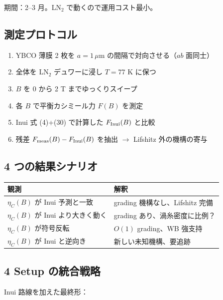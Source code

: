 \documentclass[11pt,a4paper]{article}
\def\textbf#1{#1}%
\begin{document}
\textbf{期間}：2--3 月。LN$_2$ で動くので運用コスト最小。

\subsection{測定プロトコル}

\begin{enumerate}
\item YBCO 薄膜 2 枚を $a = 1\,\mu$m の間隔で対向させる（$ab$ 面同士）
\item 全体を LN$_2$ デュワーに浸し $T = 77$ K に保つ
\item $B$ を 0 から 2 T までゆっくりスイープ
\item 各 $B$ で平衡カシミール力 $F(B)$ を測定
\item Inui 式 (4)+(30) で計算した $F_{\rm Inui}(B)$ と比較
\item 残差 $F_{\rm meas}(B) - F_{\rm Inui}(B)$ を抽出
  $\to$ Lifshitz 外の機構の寄与
\end{enumerate}

\subsection{4 つの結果シナリオ}

\begin{center}
\begin{tabular}{ll}
\toprule
観測 & 解釈 \\
\midrule
$\eta_C(B)$ が Inui 予測と一致 & grading 機構なし、Lifshitz 完備 \\
$\eta_C(B)$ が Inui より大きく動く & grading あり、渦糸密度に比例？ \\
$\eta_C(B)$ が符号反転 & $O(1)$ grading、\textbf{WB 強支持} \\
$\eta_C(B)$ が Inui と逆向き & 新しい未知機構、要追跡 \\
\bottomrule
\end{tabular}
\end{center}

\subsection{4 Setup の統合戦略}

Inui 路線を加えた最終形：
\end{document}
